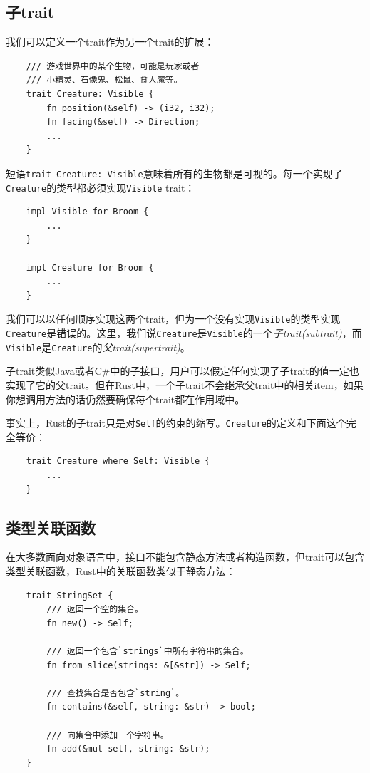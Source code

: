 \subsection{子trait}\label{subtrait}
我们可以定义一个trait作为另一个trait的扩展：
\begin{verbatim}
    /// 游戏世界中的某个生物，可能是玩家或者
    /// 小精灵、石像鬼、松鼠、食人魔等。
    trait Creature: Visible {
        fn position(&self) -> (i32, i32);
        fn facing(&self) -> Direction;
        ...
    }
\end{verbatim}

短语\texttt{trait Creature: Visible}意味着所有的生物都是可视的。每一个实现了\texttt{Creature}的类型都必须实现\texttt{Visible} trait：
\begin{verbatim}
    impl Visible for Broom {
        ...
    }

    impl Creature for Broom {
        ...
    }
\end{verbatim}
我们可以以任何顺序实现这两个trait，但为一个没有实现\texttt{Visible}的类型实现\texttt{Creature}是错误的。这里，我们说\texttt{Creature}是\texttt{Visible}的一个\emph{子trait(subtrait)}，而\texttt{Visible}是\texttt{Creature}的\emph{父trait(supertrait)}。

子trait类似Java或者C\#中的子接口，用户可以假定任何实现了子trait的值一定也实现了它的父trait。但在Rust中，一个子trait不会继承父trait中的相关item，如果你想调用方法的话仍然要确保每个trait都在作用域中。

事实上，Rust的子trait只是对\texttt{Self}的约束的缩写。\texttt{Creature}的定义和下面这个完全等价：
\begin{verbatim}
    trait Creature where Self: Visible {
        ...
    }
\end{verbatim}

\subsection{类型关联函数}
在大多数面向对象语言中，接口不能包含静态方法或者构造函数，但trait可以包含类型关联函数，Rust中的关联函数类似于静态方法：
\begin{verbatim}
    trait StringSet {
        /// 返回一个空的集合。
        fn new() -> Self;
        
        /// 返回一个包含`strings`中所有字符串的集合。
        fn from_slice(strings: &[&str]) -> Self;

        /// 查找集合是否包含`string`。
        fn contains(&self, string: &str) -> bool;

        /// 向集合中添加一个字符串。
        fn add(&mut self, string: &str);
    }
\end{verbatim}

